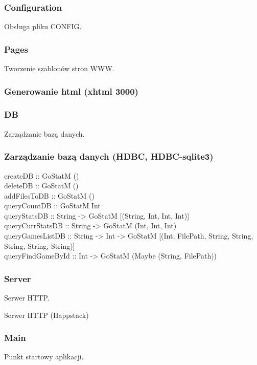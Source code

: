\documentclass[10pt,leqno]{article}
\begin{document}
\subsubsection{Configuration}
Obsługa pliku CONFIG.

\subsubsection{Pages}
Tworzenie szablonów stron WWW.
\subsubsection{Generowanie html (xhtml 3000)}
\cite{xhtml}

\cite{jquery}
\cite{jqueryui}

\subsubsection{DB}
Zarządzanie bazą danych.

\subsubsection{Zarządzanie bazą danych (HDBC, HDBC-sqlite3)}

\begin{framed}
\noindent createDB :: GoStatM () \\
deleteDB :: GoStatM () \\
addFilesToDB :: GoStatM () \\
queryCountDB :: GoStatM Int \\
queryStatsDB :: String -> GoStatM [(String, Int, Int, Int)] \\
queryCurrStatsDB :: String -> GoStatM (Int, Int, Int) \\
queryGamesListDB :: String -> Int -> GoStatM [(Int, FilePath, String, String, String, String, String)] \\
queryFindGameById :: Int -> GoStatM (Maybe (String, FilePath))
\end{framed}          

\subsubsection{Server}
Serwer HTTP. 

Serwer HTTP (Happstack)
\cite{happstack}

\subsubsection{Main}
Punkt startowy aplikacji.
\end{document}
